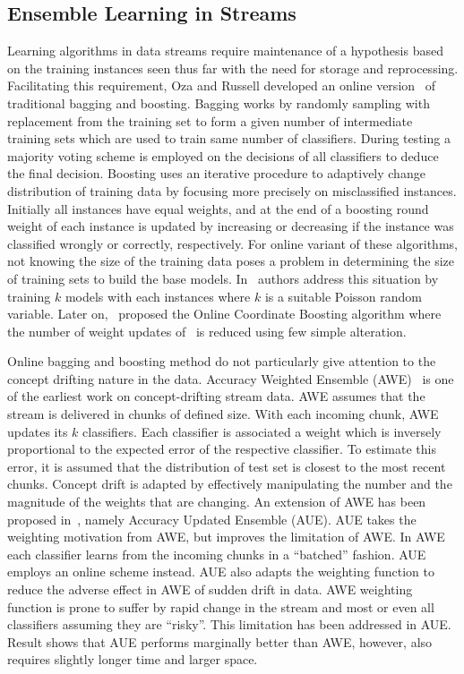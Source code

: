 \subsection{Ensemble Learning in Streams}
Learning algorithms in data streams require maintenance of a hypothesis based on the training instances seen thus far with the need for storage and reprocessing. Facilitating this requirement, Oza and Russell developed an online version~\cite{oza01:obagboost, oza01:thesis} of traditional bagging and boosting. Bagging works by randomly sampling with replacement from the training set to form a given number of intermediate training sets which are used to train same number of classifiers. During testing a majority voting scheme is employed on the decisions of all classifiers to deduce the final decision. Boosting uses an iterative procedure to adaptively change distribution of training data by focusing more precisely on misclassified instances. Initially all instances have equal weights, and at the end of a boosting round weight of each instance is updated by increasing or decreasing if the instance was classified wrongly or correctly, respectively. For online variant of these algorithms, not knowing the size of the training data poses a problem in determining the size of training sets to build the base models. In~\cite{oza01:obagboost} authors address this situation by training $k$ models with each instances where $k$ is a suitable Poisson random variable. Later on,~\cite{pelossof08:boosting} proposed the Online Coordinate Boosting algorithm where the number of weight updates of~\cite{oza01:obagboost} is reduced using few simple alteration.

Online bagging and boosting method do not particularly give attention to the concept drifting nature in the data. Accuracy Weighted Ensemble (AWE)~\cite{wang03:accuweighted} is one of the earliest work on concept-drifting stream data. AWE assumes that the stream is delivered in chunks of defined size. With each incoming chunk, AWE updates its $k$ classifiers. Each classifier is associated a weight which is inversely proportional to the expected error of the respective classifier. To estimate this error, it is assumed that the distribution of test set is closest to the most recent chunks. Concept drift is adapted by effectively manipulating the number and the magnitude of the weights that are changing. An extension of AWE has been proposed in~\cite{brzezinski11:accuupdated}, namely Accuracy Updated Ensemble (AUE). AUE takes the weighting motivation from AWE, but improves the limitation of AWE. In AWE each classifier learns from the incoming chunks in a ``batched'' fashion. AUE employs an online scheme instead. AUE also adapts the weighting function to reduce the adverse effect in AWE of sudden drift in data. AWE weighting function is prone to suffer by rapid change in the stream and most or even all classifiers assuming they are ``risky''. This limitation has been addressed in AUE. Result shows that AUE performs marginally better than AWE, however, also requires slightly longer time and larger space.

